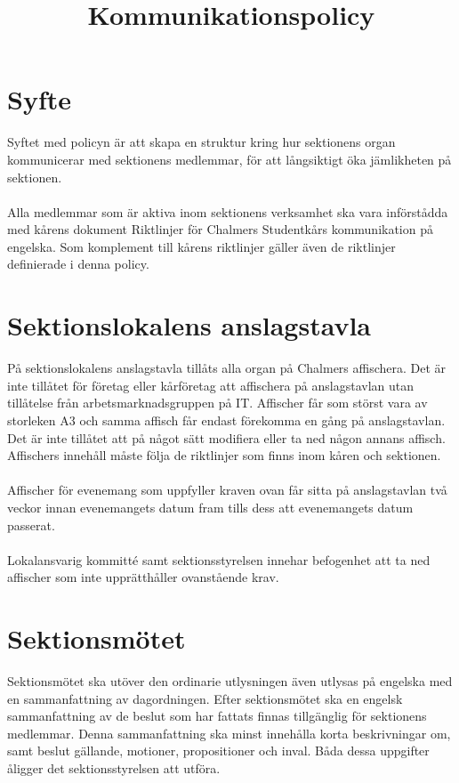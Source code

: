 \documentclass[11pt, includeaddress]{classes/cthit}
\begin{document}
\title{Kommunikationspolicy}
\maketitle

\thispagestyle{empty}

\newpage

\makeheadfoot%

\setcounter{tocdepth}{2}
\setcounter{page}{1}
\tableofcontents

\newpage

\section{Syfte}
Syftet med policyn är att skapa en struktur kring hur sektionens organ kommunicerar med sektionens medlemmar, för att långsiktigt öka jämlikheten på sektionen.\\
 \\
Alla medlemmar som är aktiva inom sektionens verksamhet ska vara införstådda med kårens dokument Riktlinjer för Chalmers Studentkårs kommunikation på engelska. Som komplement till kårens riktlinjer gäller även de riktlinjer definierade i denna policy. 

\section{Sektionslokalens anslagstavla}
På sektionslokalens anslagstavla tillåts alla organ på Chalmers affischera. Det är inte tillåtet för företag eller kårföretag att affischera på anslagstavlan utan tillåtelse från arbetsmarknadsgruppen på IT. Affischer får som störst vara av storleken A3 och samma affisch får endast förekomma en gång på anslagstavlan. Det är inte tillåtet att på något sätt modifiera eller ta ned någon annans affisch. Affischers innehåll måste följa de riktlinjer som finns inom kåren och sektionen. \\
 \\
Affischer för evenemang som uppfyller kraven ovan får sitta på anslagstavlan två veckor innan evenemangets datum fram tills dess att evenemangets datum passerat. \\
 \\
Lokalansvarig kommitté samt sektionsstyrelsen innehar befogenhet att ta ned affischer som inte upprätthåller ovanstående krav. 

\section{Sektionsmötet}
Sektionsmötet ska utöver den ordinarie utlysningen även utlysas på engelska med en sammanfattning av dagordningen. Efter sektionsmötet ska en engelsk sammanfattning av de beslut som har fattats finnas tillgänglig för sektionens medlemmar. Denna sammanfattning ska minst innehålla korta beskrivningar om, samt beslut gällande, motioner, propositioner och inval. Båda dessa uppgifter åligger det sektionsstyrelsen att utföra.
\end{document}

